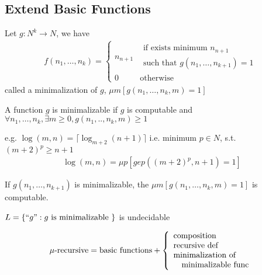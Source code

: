 \subsection{Extend Basic Functions}
\begin{definition}[minimalization]
    Let $g:N^k\to N$, we have
    {
    \begin{align*}
        f(n_1,\dots,n_k)=\left\{ \begin{array}{ll}
            n_{n+1} & \begin{array}{l}
                \text{if exists minimum } n_{n+1}\\
                \text{such that }g(n_1,\dots,n_{k+1})=1
            \end{array}\\
            0 & \text{otherwise}
        \end{array} \right.
    \end{align*}
    }
    called a minimalization of $g$, $\mu m[g(n_1,\dots,n_k,m)=1]$
\end{definition}

\begin{theorem}
    A function $g$ is minimalizable if $g$ is computable and $\forall n_1,\dots,n_k, \exists m\ge 0, g(n_1,..   ,n_k,m)\ge 1$
\end{theorem}

e.g. $\log(m,n)=\lceil \log_{m+2}(n+1)\rceil$ i.e. minimum $p\in N$, s.t. $(m+2)^p\ge n+1$
\begin{align*}
    \log(m,n)=\mu p \left[gep((m+2)^p, n+1)=1\right]
\end{align*}

\begin{theorem}
    If $g(n_1,\dots,n_{k+1})$ is minimalizable, the $\mu m[g(n_1,\dots,n_k,m)=1]$ is computable. 
\end{theorem}

\begin{theorem}
    $L=\{{``g"}: g\text{ is minimalizable }\}$ is undecidable
\end{theorem}

\begin{definition}[$\mu$-recursive]
    \begin{align*}
        \mu\text{-recursive}=\text{basic functions} + \left\{ \begin{array}{l}
            \text{composition}\\
            \text{recursive def}\\
            \text{minimalization of}\\
            \text{\quad minimalizable  func}
        \end{array} \right.
    \end{align*}
\end{definition}

